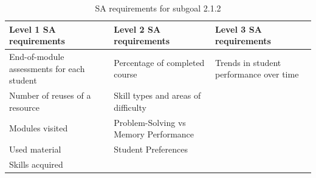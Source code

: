 \begin{table}[H]
\begin{center}
\begin{tabular}{ | m{5cm} | m{5cm}| m{5cm} | } 
  \hline
  \textbf{Level 1 SA requirements} & \textbf{Level 2 SA requirements}  & \textbf{Level 3 SA requirements}  \\ 
  \hline
  End-of-module assessments for each student & Percentage of completed course & Trends in student performance over time \\ 
  \hline
  Number of reuses of a resource & Skill types and areas of difficulty & \\ 
  \hline
  Modules visited & Problem-Solving vs Memory Performance & \\ 
  \hline
  Used material & Student Preferences & \\ 
  \hline
  Skills acquired &  & \\ 
  \hline
\end{tabular}
\end{center}
\caption{SA requirements for subgoal 2.1.2}
\end{table}